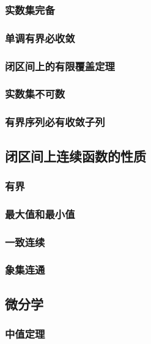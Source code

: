 \subsubsection{实数集完备}

\subsubsection{单调有界必收敛}

\subsubsection{闭区间上的有限覆盖定理}

\subsubsection{实数集不可数}

\subsubsection{有界序列必有收敛子列}

\subsection{闭区间上连续函数的性质}

\subsubsection{有界}

\subsubsection{最大值和最小值}

\subsubsection{一致连续}

\subsubsection{象集连通}

\subsection{微分学}

\subsubsection{中值定理}

